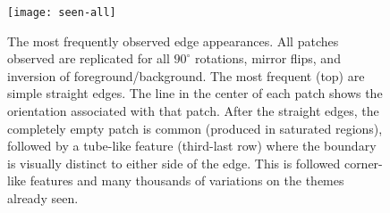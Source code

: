 
\ifnote
\begin{figure}[tb]
\begin{center}
\texttt{[image: seen-all]}
\caption{
\label{fig:lines-all}
%
The most frequently observed edge appearances.  All patches
observed are replicated for all $90^{\circ}$ rotations, mirror flips,
and inversion of foreground/background.
%
The most frequent (top) are simple straight edges.
%
The line in the center of
each patch shows the orientation associated with that patch.  
%
After the straight edges, the completely empty patch
is common (produced in saturated regions), 
followed by a tube-like feature (third-last row)
where the boundary is visually distinct to either side of
the edge.
This is followed corner-like features and
many thousands of variations on the themes already seen.  
%
}
\end{center}
\end{figure}
\fi
